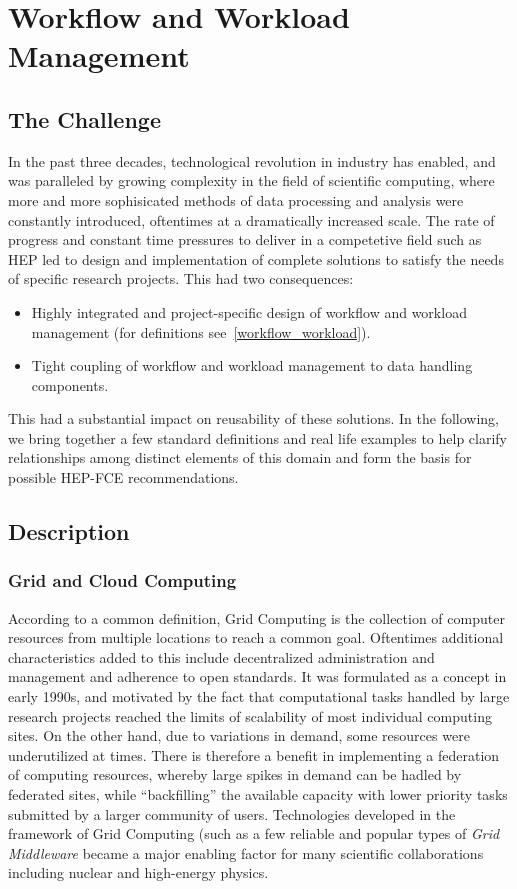 \newpage
\section{Workflow and Workload Management}
\subsection{The Challenge}
In the past three decades, technological revolution in industry has enabled, and was paralleled by growing complexity in the field of scientific computing, where 
more and more sophisicated methods of data processing and analysis were constantly introduced, oftentimes at a dramatically increased scale. The rate of progress
and constant time pressures to deliver in a competetive field such as HEP led to design and implementation of complete solutions to satisfy the needs of specific  research projects.
This had two consequences:

\begin{itemize}
\item Highly integrated and project-specific design of workflow and workload management (for definitions see~\ref{workflow_workload}).
\item Tight coupling of workflow and workload management to data handling components.
\end{itemize}
This had a substantial impact on reusability of these solutions. In the following, we  bring together a few standard definitions and real life examples to help clarify
relationships among distinct elements of this domain and form the basis for possible HEP-FCE recommendations.

\subsection{Description}

\subsubsection{Grid and Cloud Computing}
According to a common definition, Grid Computing is the collection of computer resources from multiple locations to reach a common goal. Oftentimes additional characteristics added to this include decentralized
administration and management and adherence to open standards. It was formulated as a concept in early 1990s, and motivated by the fact that computational tasks handled by large research projects reached
the limits of scalability of most individual computing sites. On the other hand, due to variations in demand, some resources were underutilized at times. There is therefore a benefit in implementing a federation of
computing resources, whereby large spikes in demand can be hadled by federated sites, while ``backfilling'' the available capacity with lower priority tasks submitted by a larger community of users.
Technologies developed in the framework of Grid Computing (such as a few reliable and popular types of \textit{Grid Middleware} became a major enabling factor for many scientific collaborations including
nuclear and high-energy physics.


